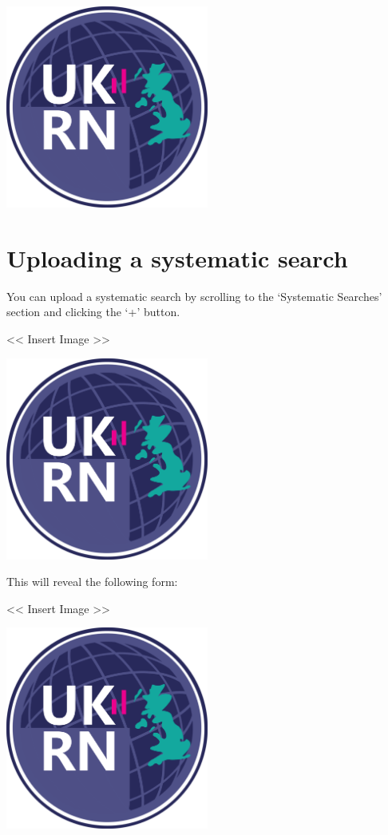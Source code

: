 \documentclass[
]{book}
\begin{document}
\includegraphics[width=0.5\textwidth,height=0.5\textheight]{figs/evidence-triangle.png}

\hypertarget{uploading-a-systematic-search}{%
\section{Uploading a systematic search}\label{uploading-a-systematic-search}}

You can upload a systematic search by scrolling to the `Systematic Searches' section and clicking the `+' button.

\textless{}\textless{} Insert Image \textgreater{}\textgreater{}

\includegraphics[width=0.5\textwidth,height=0.5\textheight]{figs/evidence-triangle.png}

This will reveal the following form:

\textless{}\textless{} Insert Image \textgreater{}\textgreater{}

\includegraphics[width=0.5\textwidth,height=0.5\textheight]{figs/evidence-triangle.png}
\end{document}
